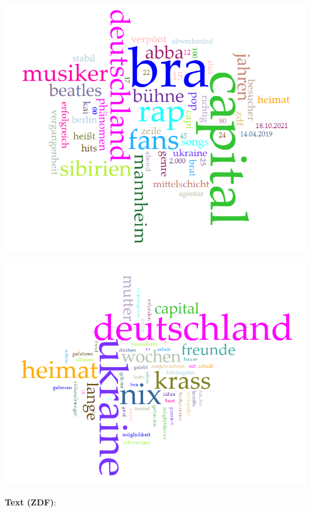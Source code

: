 \documentclass[
  letterpaper,
  DIV=11,
  numbers=noendperiod]{scrreprt}
\begin{document}
\includegraphics[width=1\textwidth,height=\textheight]{./pictures/capital_bra_untertitel.png}

\includegraphics[width=1\textwidth,height=\textheight]{./pictures/capital_bra_zdf.png}

\textbf{Text (ZDF)}:
\end{document}
